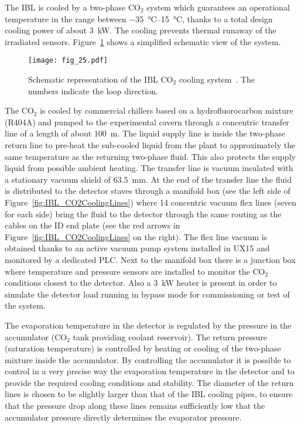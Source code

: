 \documentclass[cernpreprint, atlasdraft=false, UKenglish,british,orcidlogo, texmf, orcidlogo]{atlasdoc}
\begin{document}
The \gls{IBL} is cooled by a two-phase ${\text{CO}}_2$ system which guarantees an operational temperature in the range between \SIrange[retain-explicit-plus]{-35}{+15}{\degreeCelsius}, thanks to a total design cooling power of about \SI{3}{\kW}. The cooling prevents thermal runaway of the irradiated sensors. Figure~\ref{fig:IBL-CO2Cooling} shows a simplified schematic view of the system.
 
\begin{figure}
\centering
\texttt{[image: fig\_25.pdf]}
\caption{Schematic representation of the \gls{IBL} ${\text{CO}}_2$ cooling system~\cite{PIX-2018-001}. The numbers indicate the loop direction.}
\label{fig:IBL-CO2Cooling}
\end{figure}
 
The ${\text{CO}}_2$ is cooled by commercial chillers based on a hydrofluorocarbon mixture (R404A) and pumped to the experimental cavern through a concentric transfer line of a length of about \SI{100}{\m}.  The liquid supply line is inside the two-phase return line to pre-heat the sub-cooled liquid from the plant to approximately the same temperature as the returning two-phase fluid.
This also protects the supply liquid from possible ambient heating. The transfer line is vacuum insulated with a stationary vacuum shield of \SI{63.5}{\mm}.
At the end of the transfer line the fluid is distributed to the detector staves through a manifold box (see the left side of Figure~\ref{fig:IBL_CO2CoolingLines}) where \num{14} concentric vacuum flex lines (seven for each side) bring the fluid to the detector through the same routing as the cables on the \gls{ID} end plate (see the red arrows in Figure~\ref{fig:IBL_CO2CoolingLines} on the right).
The flex line vacuum is obtained thanks to an active vacuum pump system installed in \gls{UX15} and monitored by a dedicated
\gls{PLC}.
Next to the manifold box there is a junction box where temperature and pressure sensors are installed to monitor the
${\text{CO}}_2$ conditions closest to the detector. Also a \SI{3}{\kW} heater is present in order to simulate the detector load running in bypass mode for
commissioning or test of the system.
 
The evaporation temperature in the detector is regulated by the pressure in the accumulator (${\text{CO}}_2$ tank providing coolant reservoir).
The return pressure (saturation temperature) is controlled by heating or cooling of the two-phase mixture inside the accumulator.
By controlling the accumulator it is possible to control in a very precise way the evaporation temperature in the detector and to provide the required cooling conditions and stability.
The diameter of the return lines is chosen to be slightly larger than that of the \gls{IBL} cooling pipes, to ensure that the pressure drop along these lines remains sufficiently low that the accumulator pressure directly determines the evaporator pressure.
 
\end{document}
